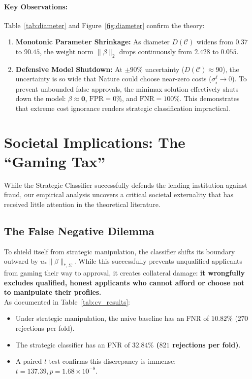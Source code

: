 \documentclass[10pt, letterpaper]{article}
\newcommand{\C}{\mathcal{C}}
\begin{document}
\paragraph{Key Observations:}
Table~\ref{tab:diameter} and Figure~\ref{fig:diameter} confirm the theory:
\begin{enumerate}[leftmargin=*]
    \item \textbf{Monotonic Parameter Shrinkage:} As diameter $D(\C)$ widens from $0.37$ to $90.45$, the weight norm $\|\beta\|_2$ drops continuously from $2.428$ to $0.055$.
    \item \textbf{Defensive Model Shutdown:} At $\pm 90\%$ uncertainty ($D(\C) \approx 90$), the uncertainty is so wide that Nature could choose near-zero costs ($\sigma_i^\ell \to 0$). To prevent unbounded false approvals, the minimax solution effectively shuts down the model: $\beta \approx \mathbf{0}$, $\text{FPR} = 0\%$, and $\text{FNR} = 100\%$. This demonstrates that extreme cost ignorance renders strategic classification impractical.
\end{enumerate}

\section{Societal Implications: The ``Gaming Tax''}
\label{sec:gaming_tax}

While the Strategic Classifier successfully defends the lending institution against fraud, our empirical analysis uncovers a critical societal externality that has received little attention in the theoretical literature.

\subsection{The False Negative Dilemma}
To shield itself from strategic manipulation, the classifier shifts its boundary outward by $u_* \|\beta\|_{*,\Sigma}$. While this successfully prevents unqualified applicants from gaming their way to approval, it creates collateral damage: \textbf{it wrongfully excludes qualified, honest applicants who cannot afford or choose not to manipulate their profiles.}
\\

As documented in Table~\ref{tab:cv_results}:
\begin{itemize}[leftmargin=*]
    \item Under strategic manipulation, the naive baseline has an FNR of $10.82\%$ ($270$ rejections per fold).
    \item The strategic classifier has an FNR of \textbf{$32.84\%$ ($821$ rejections per fold)}.
    \item A paired $t$-test confirms this discrepancy is immense: $t = 137.39, p = 1.68 \times 10^{-8}$.
\end{itemize}
\end{document}
